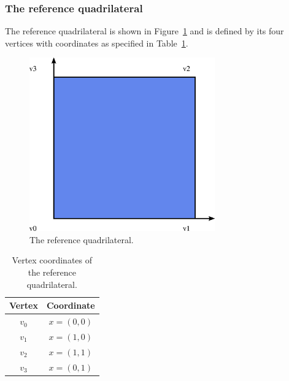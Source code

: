\subsubsection{The reference quadrilateral}

The reference quadrilateral is shown in Figure~\ref{fig:quadrilateral}
and is defined by its four vertices with coordinates as specified in
Table~\ref{tab:quadrilateral,vertices}.

\begin{figure}
  \begin{center}
    \includegraphics[width=8cm]{chapters/alnes-2/eps/quadrilateral.eps}
    \caption{The reference quadrilateral.}
    \label{fig:quadrilateral}
  \end{center}
\end{figure}

\begin{table}
\linespread{1.2}\selectfont
  \begin{center}
    \begin{tabular}{|c|c|}
      \hline
      Vertex & Coordinate \\
      \hline
      \hline
      $v_0$ & $x = (0, 0)$ \\
      \hline
      $v_1$ & $x = (1, 0)$ \\
      \hline
      $v_2$ & $x = (1, 1)$ \\
      \hline
      $v_3$ & $x = (0, 1)$ \\
      \hline
    \end{tabular}
    \caption{Vertex coordinates of the reference quadrilateral.}
    \label{tab:quadrilateral,vertices}
  \end{center}
\end{table}

